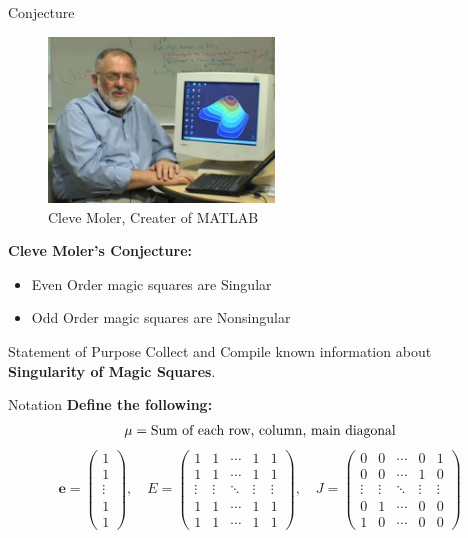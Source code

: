 \documentclass[10pt]{beamer}
\begin{document}
  \begin{frame}{Conjecture}
    \begin{figure}[h!]
        \begin{center}
            \includegraphics[width=60mm]{cleve moler.jpg}
            \caption{Cleve Moler, Creater of MATLAB}
        \end{center}
    \end{figure}

    \textbf{Cleve Moler's Conjecture:}
    \begin{itemize}
        \item Even Order magic squares are Singular 
        \item Odd Order magic squares are Nonsingular
    \end{itemize}
  \end{frame}

  \begin{frame}{Statement of Purpose}
    Collect and Compile known information about \textbf{Singularity of Magic Squares}.
  \end{frame}

\begin{frame}{Notation}
    \textbf{Define the following:}
    \[\mu = \textmd{Sum of each row, column, main diagonal}\]
    \[\textbf{e}=\begin{pmatrix}
    1\\1\\\vdots\\1\\1
    \end{pmatrix},\quad E=\begin{pmatrix}
        1&1&\cdots&1&1\\
        1&1&\cdots&1&1\\
        \vdots&\vdots&\ddots&\vdots&\vdots\\
        1&1&\cdots&1&1\\
        1&1&\cdots&1&1
    \end{pmatrix},\quad J=\begin{pmatrix}
        0&0&\cdots&0&1\\
        0&0&\cdots&1&0\\
        \vdots&\vdots&\ddots&\vdots&\vdots\\
        0&1&\cdots&0&0\\
        1&0&\cdots&0&0
    \end{pmatrix}\]
\end{frame}
\end{document}
